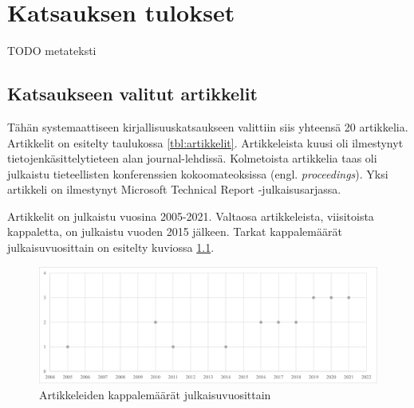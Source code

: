 \documentclass[utf8]{gradu3}
\begin{document}
\chapter{Katsauksen tulokset}

TODO metateksti



\section{Katsaukseen valitut artikkelit}

Tähän systemaattiseen kirjallisuuskatsaukseen valittiin siis yhteensä 20 artikkelia. Artikkelit on esitelty taulukossa \ref{tbl:artikkelit}. Artikkeleista kuusi oli ilmestynyt tietojenkäsittelytieteen alan journal-lehdissä. Kolmetoista artikkelia taas oli julkaistu tieteellisten konferenssien kokoomateoksissa (engl. \textit{proceedings}). Yksi artikkeli \parencite{hemphill-begel-2011} on ilmestynyt Microsoft Technical Report -julkaisusarjassa. 

Artikkelit on julkaistu vuosina 2005-2021. Valtaosa artikkeleista, viisitoista kappaletta, on julkaistu vuoden 2015 jälkeen. Tarkat kappalemäärät julkaisuvuosittain on esitelty kuviossa \ref{kuvio:kappalemaarat-julkaisuvuosittain}.

\begin{figure}[h]
    \centering
    \includegraphics[width=\textwidth]{media/kappalemaarat-julkaisuvuosittain.png}
    \caption{Artikkeleiden kappalemäärät julkaisuvuosittain}
    \label{kuvio:kappalemaarat-julkaisuvuosittain}
\end{figure}
\end{document}
